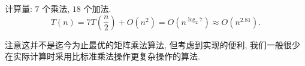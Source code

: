 \documentclass[a4paper]{ctexart}
\theoremstyle{definition}
\theoremstyle{definition}
\begin{document}
计算量: $7$ 个乘法, $18$ 个加法. 
\begin{equation}
  T(n) = 7 T(\frac{n}{2}) + O(n^2) = O(n^{\log_2 7}) \approx O(n^{2.81}).
\end{equation}

注意这并不是迄今为止最优的矩阵乘法算法, 但考虑到实现的便利, 
我们一般很少在实际计算时采用比标准乘法操作更复杂操作的算法. 





  
\end{document}
